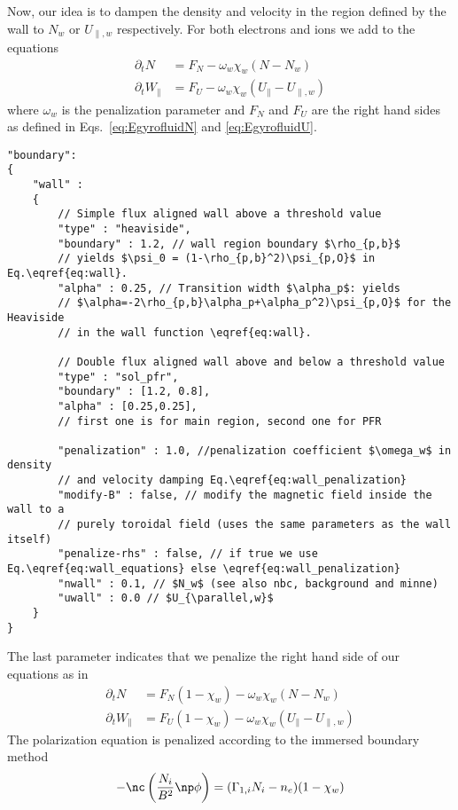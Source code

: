 Now, our idea is to dampen the density and velocity in the region defined by the
wall to $N_w$ or $U_{\parallel,w}$ respectively.
For both electrons and ions we add to the equations
\begin{subequations} \label{eq:wall_penalization}
\begin{align}
    \partial_t N &= F_N -\omega_w\chi_w (N-N_w)\\
    \partial_t W_\parallel &= F_U -\omega_w\chi_w (U_\parallel-U_{\parallel,w})
\end{align}
\end{subequations}
where $\omega_w$ is the penalization parameter and $F_N$ and $F_U$ are the
right hand sides as defined in Eqs.~\eqref{eq:EgyrofluidN} and \eqref{eq:EgyrofluidU}.
\begin{verbatim}
"boundary":
{
    "wall" :
    {
        // Simple flux aligned wall above a threshold value
        "type" : "heaviside",
        "boundary" : 1.2, // wall region boundary $\rho_{p,b}$
        // yields $\psi_0 = (1-\rho_{p,b}^2)\psi_{p,O}$ in Eq.\eqref{eq:wall}.
        "alpha" : 0.25, // Transition width $\alpha_p$: yields
        // $\alpha=-2\rho_{p,b}\alpha_p+\alpha_p^2)\psi_{p,O}$ for the Heaviside
        // in the wall function \eqref{eq:wall}.

        // Double flux aligned wall above and below a threshold value
        "type" : "sol_pfr",
        "boundary" : [1.2, 0.8],
        "alpha" : [0.25,0.25],
        // first one is for main region, second one for PFR

        "penalization" : 1.0, //penalization coefficient $\omega_w$ in density
        // and velocity damping Eq.\eqref{eq:wall_penalization}
        "modify-B" : false, // modify the magnetic field inside the wall to a
        // purely toroidal field (uses the same parameters as the wall itself)
        "penalize-rhs" : false, // if true we use Eq.\eqref{eq:wall_equations} else \eqref{eq:wall_penalization}
        "nwall" : 0.1, // $N_w$ (see also nbc, background and minne)
        "uwall" : 0.0 // $U_{\parallel,w}$
    }
}
\end{verbatim}
\noindent
The last parameter indicates that we penalize the right hand side of our equations
as in
\begin{subequations} \label{eq:wall_equations}
\begin{align}
    \partial_t N &= F_N ( 1-\chi_w) -\omega_w\chi_w (N-N_w)\\
\partial_t W_\parallel &= F_U ( 1 - \chi_w) -\omega_w\chi_w (U_\parallel-U_{\parallel,w})
\end{align}
\end{subequations}
The polarization equation is penalized according to the immersed boundary method
\begin{align}
    -\nc\left( \frac{N_i}{B^2}\np \phi \right) = (\Gamma_{1,i} N_i - n_e)(1-\chi_w)
\end{align}


